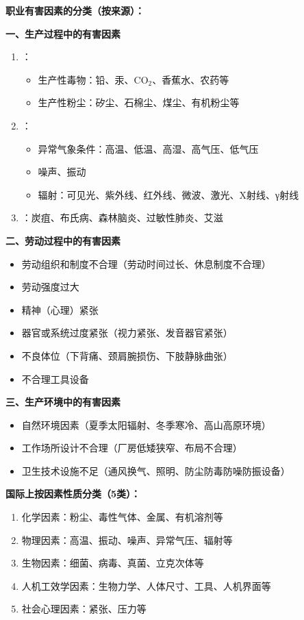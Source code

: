 \begin{keybox}
\textbf{职业有害因素的分类（按来源）：}

\textbf{一、生产过程中的有害因素}
\begin{enumerate}[leftmargin=*]
    \item {}：
    \begin{itemize}
        \item 生产性毒物：铅、汞、CO$_2$、香蕉水、农药等
        \item 生产性粉尘：矽尘、石棉尘、煤尘、有机粉尘等
    \end{itemize}
    \item {}：
    \begin{itemize}
        \item 异常气象条件：高温、低温、高湿、高气压、低气压
        \item 噪声、振动
        \item 辐射：可见光、紫外线、红外线、微波、激光、X射线、γ射线
    \end{itemize}
    \item {}：炭疽、布氏病、森林脑炎、过敏性肺炎、艾滋
\end{enumerate}

\textbf{二、劳动过程中的有害因素}
\begin{itemize}[leftmargin=*]
    \item 劳动组织和制度不合理（劳动时间过长、休息制度不合理）
    \item 劳动强度过大
    \item 精神（心理）紧张
    \item 器官或系统过度紧张（视力紧张、发音器官紧张）
    \item 不良体位（下背痛、颈肩腕损伤、下肢静脉曲张）
    \item 不合理工具设备
\end{itemize}

\textbf{三、生产环境中的有害因素}
\begin{itemize}[leftmargin=*]
    \item 自然环境因素（夏季太阳辐射、冬季寒冷、高山高原环境）
    \item 工作场所设计不合理（厂房低矮狭窄、布局不合理）
    \item 卫生技术设施不足（通风换气、照明、防尘防毒防噪防振设备）
\end{itemize}

\textbf{国际上按因素性质分类（5类）：}
\begin{enumerate}[leftmargin=*]
    \item 化学因素：粉尘、毒性气体、金属、有机溶剂等
    \item 物理因素：高温、振动、噪声、异常气压、辐射等
    \item 生物因素：细菌、病毒、真菌、立克次体等
    \item 人机工效学因素：生物力学、人体尺寸、工具、人机界面等
    \item 社会心理因素：紧张、压力等
\end{enumerate}
\end{keybox}

